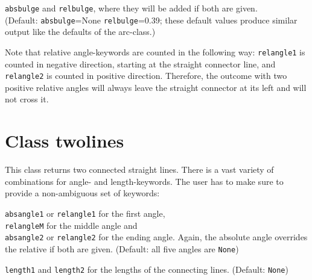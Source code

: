 \verb|absbulge| and \verb|relbulge|, where they will be added if both are
given.\\ (Default: \verb|absbulge|=None \verb|relbulge|=0.39; these default
values produce similar output like the defaults of the arc-class.)\medskip


Note that relative angle-keywords are counted in the following way:
\verb|relangle1| is counted in negative direction, starting at the straight
connector line, and \verb|relangle2| is counted in positive direction.
Therefore, the outcome with two positive relative angles will always leave the
straight connector at its left and will not cross it.

\section{Class twolines}

This class returns two connected straight lines. There is a vast variety of
combinations for angle- and length-keywords. The user has to make sure to
provide a non-ambiguous set of keywords:\medskip

\verb|absangle1| or \verb|relangle1| for the first angle,\\
\verb|relangleM| for the middle angle and\\
\verb|absangle2| or \verb|relangle2| for the ending angle.
Again, the absolute angle overrides the relative if both are given. (Default:
all five angles are \verb|None|)\medskip

\verb|length1| and \verb|length2| for the lengths of the connecting lines.
(Default: \verb|None|)

